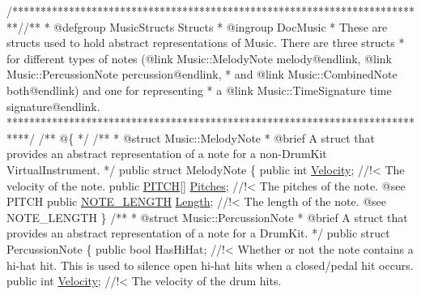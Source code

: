 \begin{DoxyCodeInclude}
    \textcolor{comment}{/*************************************************************************/}\textcolor{comment}{/** }
\textcolor{comment}{    * @defgroup MusicStructs Structs}
\textcolor{comment}{    * @ingroup DocMusic}
\textcolor{comment}{    * These are structs used to hold abstract representations of Music. There are three structs}
\textcolor{comment}{    * for different types of notes (@link Music::MelodyNote melody@endlink, @link Music::PercussionNote
       percussion@endlink, }
\textcolor{comment}{    * and @link Music::CombinedNote both@endlink) and one for representing}
\textcolor{comment}{    * a @link Music::TimeSignature time signature@endlink.}
\textcolor{comment}{    ****************************************************************************/}\textcolor{comment}{}
\textcolor{comment}{    /** @\{ */}
\textcolor{comment}{}
\textcolor{comment}{    /**}
\textcolor{comment}{     * @struct Music::MelodyNote}
\textcolor{comment}{     * @brief A struct that provides an abstract representation of a note for a non-DrumKit
       VirtualInstrument.}
\textcolor{comment}{    */}
    \textcolor{keyword}{public} \textcolor{keyword}{struct }MelodyNote
    \{
        \textcolor{keyword}{public} \textcolor{keywordtype}{int} \hyperlink{group___music_structs_a0c87d54ce8d28ea08fb4a526cb821c20}{Velocity}; \textcolor{comment}{//!< The velocity of the note.}
\textcolor{comment}{}        \textcolor{keyword}{public} \hyperlink{group___music_enums_ga508f69b199ea518f935486c990edac1d}{PITCH}[] \hyperlink{group___music_structs_aab23b49ea9d7961aef5091154ce45946}{Pitches}; \textcolor{comment}{//!< The pitches of the note. @see PITCH}
\textcolor{comment}{}        \textcolor{keyword}{public} \hyperlink{group___music_enums_gaf11b5f079adbb21c800b9eca1c5c3cbd}{NOTE\_LENGTH} \hyperlink{group___music_structs_ac35cd02f5b3c00e3040b51e40e9e6c94}{Length}; \textcolor{comment}{//!< The length of the note. @see NOTE\_LENGTH}
\textcolor{comment}{}    \}
\textcolor{comment}{}
\textcolor{comment}{    /**}
\textcolor{comment}{     * @struct Music::PercussionNote}
\textcolor{comment}{     * @brief A struct that provides an abstract representation of a note for a DrumKit.}
\textcolor{comment}{    */}
    \textcolor{keyword}{public} \textcolor{keyword}{struct }PercussionNote
    \{
        \textcolor{keyword}{public} \textcolor{keywordtype}{bool} HasHiHat; \textcolor{comment}{//!< Whether or not the note contains a hi-hat hit. This is used to silence
       open hi-hat hits when a closed/pedal hit occurs.}
\textcolor{comment}{}        \textcolor{keyword}{public} \textcolor{keywordtype}{int} \hyperlink{group___music_structs_a0c87d54ce8d28ea08fb4a526cb821c20}{Velocity}; \textcolor{comment}{//!< The velocity of the drum hits.}

\end{DoxyCodeInclude}
